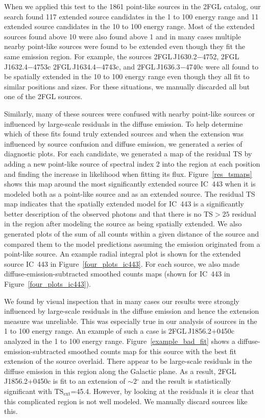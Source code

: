 \documentclass[12pt,preprint]{aastex}
\newcommand{\gev}{\text{GeV}\xspace}
\newcommand{\tsext}{{\ensuremath{\text{TS}_{\text{ext}}}}\xspace}
\newcommand{\ts}{\text{TS}\xspace}
\newcommand{\degree}{\ensuremath{^\circ}\xspace}
\begin{document}
When we applied this test to the 1861 point-like sources in the 2FGL catalog, our
search found 117 extended source candidates in the 1 \gev to 100 \gev
energy range and 11 extended source candidates in the 10 \gev to 100
\gev energy range. Most of the extended sources found above 10 \gev were
also found above 1 \gev and in many cases multiple nearby point-like
sources were found to be extended even though they fit the same emission region.
For example, the sources 2FGL\,J1630.2$-$4752, 2FGL\,J1632.4$-$4753c 2FGL\,J1634.4$-$4743c,
and 2FGL\,J1636.3$-$4740c were all found to be spatially extended in the
10 \gev to 100 \gev energy range even though they all fit to similar
positions and sizes.  For these situations, we manually discarded all
but one of the 2FGL sources.

Similarly, many of these sources were confused with nearby
point-like sources or influenced by large-scale residuals in the
diffuse emission.  To help determine which of these fits found
truly extended sources and when the extension was
influenced by source confusion and diffuse emission, we generated a
series of diagnostic plots.  For each candidate, we generated a map
of the residual TS by adding a new point-like source of spectral index 2 into the
region at each position and finding the increase in likelihood when fitting
its flux. Figure~\ref{res_tsmaps} shows this map around the
most significantly extended source IC~443 when it is modeled both as a
point-like source and as an extended source.  The residual TS
map indicates
that the spatially extended model for IC~443 is a significantly better
description of the observed photons and that there is no $\ts>25$
residual in the region after modeling the source as being spatially extended.
We also generated plots of the sum of all counts within a given distance of
the source and compared them to the model predictions assuming the emission
originated from a point-like source.  An example radial integral plot
is shown for the extended source IC~443 in Figure~\ref{four_plots_ic443}.
For each source, we also made diffuse-emission-subtracted smoothed counts
maps (shown for IC~443 in Figure~\ref{four_plots_ic443}).

We found by visual inspection that in many
cases our results were strongly influenced by large-scale residuals in the
diffuse emission and hence the extension measure was unreliable.  This was
especially true in our analysis of sources in the 1 \gev to 100 \gev
energy range.  An example of such a case is 2FGL\,J1856.2+0450c analyzed
in the 1 \gev to 100 \gev energy range. Figure~\ref{example_bad_fit}
shows a diffuse-emission-subtracted smoothed counts map for
this source with the best
fit extension of the source overlaid. There appear to be large-scale
residuals in the diffuse emission in this region along the Galactic plane.
As a result, 2FGL\,J1856.2+0450c is fit to an extension of $\sim2\degree$
and the result is statistically significant with \tsext=45.4. However,
by looking at the residuals it is clear that this complicated region is
not well modeled. We manually discard sources like this.
\end{document}
